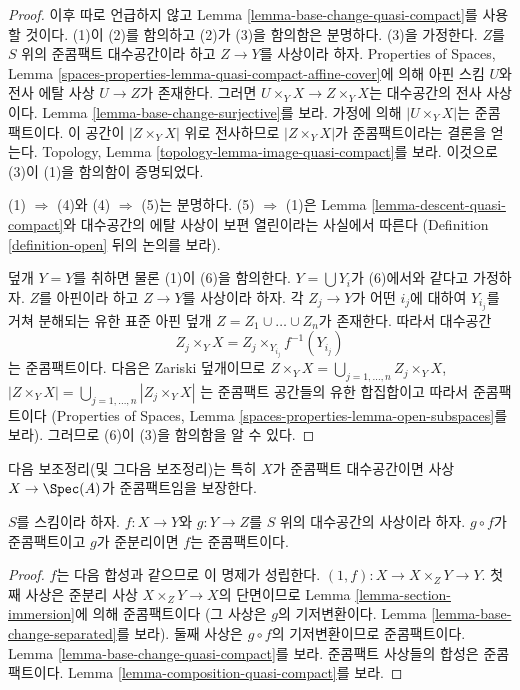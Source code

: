\begin{proof}
이후 따로 언급하지 않고 Lemma \ref{lemma-base-change-quasi-compact}를
사용할 것이다. (1)이 (2)를 함의하고 (2)가 (3)을 함의함은 분명하다.
(3)을 가정한다. $Z$를 $S$ 위의 준콤팩트 대수공간이라 하고
$Z \to Y$를 사상이라 하자. Properties of Spaces, Lemma
\ref{spaces-properties-lemma-quasi-compact-affine-cover}에 의해
아핀 스킴 $U$와 전사 에탈 사상 $U \to Z$가 존재한다.
그러면 $U \times_Y X \to Z \times_Y X$는 대수공간의 전사 사상이다.
Lemma \ref{lemma-base-change-surjective}를 보라.
가정에 의해 $|U \times_Y X|$는 준콤팩트이다.
이 공간이 $|Z \times_Y X|$ 위로 전사하므로
$|Z \times_Y X|$가 준콤팩트이라는 결론을 얻는다.
Topology, Lemma \ref{topology-lemma-image-quasi-compact}를 보라.
이것으로 (3)이 (1)을 함의함이 증명되었다.

\medskip\noindent
(1) $\Rightarrow$ (4)와 (4) $\Rightarrow$ (5)는 분명하다.
(5) $\Rightarrow$ (1)은 Lemma \ref{lemma-descent-quasi-compact}와
대수공간의 에탈 사상이 보편 열린이라는 사실에서 따른다
(Definition \ref{definition-open} 뒤의 논의를 보라).

\medskip\noindent
덮개 $Y = Y$를 취하면 물론 (1)이 (6)을 함의한다.
$Y = \bigcup Y_i$가 (6)에서와 같다고 가정하자.
$Z$를 아핀이라 하고 $Z \to Y$를 사상이라 하자.
각 $Z_j \to Y$가 어떤 $i_j$에 대하여 $Y_{i_j}$를 거쳐 분해되는
유한 표준 아핀 덮개 $Z = Z_1 \cup \ldots \cup Z_n$가 존재한다.
따라서 대수공간
$$
Z_j \times_Y X = Z_j \times_{Y_{i_j}} f^{-1}(Y_{i_j})
$$
는 준콤팩트이다. 다음은 Zariski 덮개이므로
$Z \times_Y X = \bigcup_{j = 1, \ldots, n} Z_j \times_Y X$,
$|Z \times_Y X| = \bigcup_{j = 1, \ldots, n} |Z_j \times_Y X|$
는 준콤팩트 공간들의 유한 합집합이고 따라서 준콤팩트이다
(Properties of Spaces, Lemma
\ref{spaces-properties-lemma-open-subspaces}를 보라).
그러므로 (6)이 (3)을 함의함을 알 수 있다.
\end{proof}

\noindent
다음 보조정리(및 그다음 보조정리)는 특히 $X$가 준콤팩트 대수공간이면
사상 $X \to \Spec(A)$가 준콤팩트임을 보장한다.

\begin{lemma}
\label{lemma-quasi-compact-permanence}
$S$를 스킴이라 하자.
$f : X \to Y$와 $g : Y \to Z$를 $S$ 위의 대수공간의 사상이라 하자.
$g \circ f$가 준콤팩트이고 $g$가 준분리이면 $f$는 준콤팩트이다.
\end{lemma}

\begin{proof}
$f$는 다음 합성과 같으므로 이 명제가 성립한다.
$(1, f) : X \to X \times_Z Y \to Y$.
첫째 사상은 준분리 사상 $X \times_Z Y \to X$의 단면이므로
Lemma \ref{lemma-section-immersion}에 의해 준콤팩트이다
(그 사상은 $g$의 기저변환이다. Lemma
\ref{lemma-base-change-separated}를 보라).
둘째 사상은 $g \circ f$의 기저변환이므로 준콤팩트이다.
Lemma \ref{lemma-base-change-quasi-compact}를 보라.
준콤팩트 사상들의 합성은 준콤팩트이다.
Lemma \ref{lemma-composition-quasi-compact}를 보라.
\end{proof}

